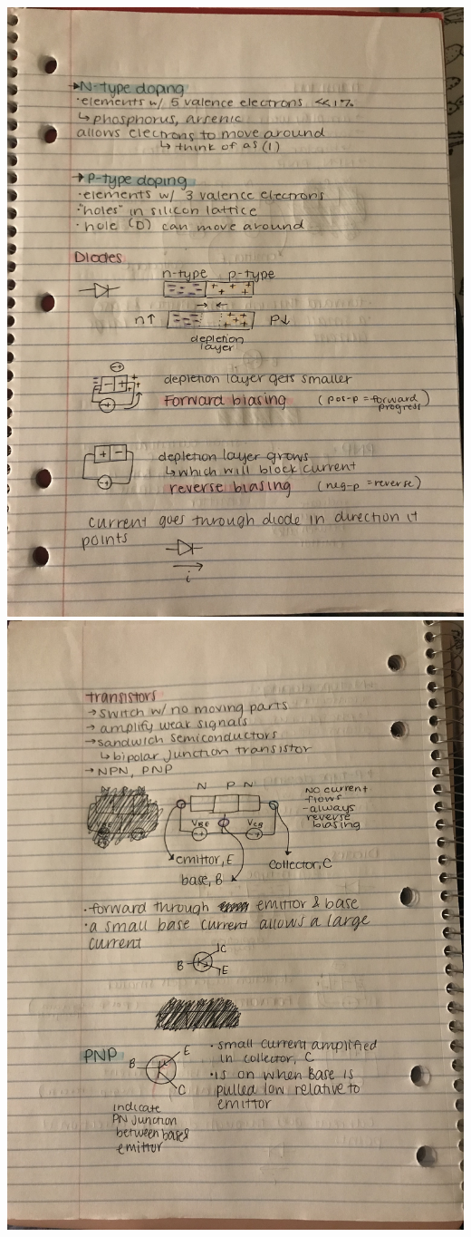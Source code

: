 \documentclass[11pt]{book}
\begin{document}
\\
\includegraphics[width=\textwidth]{figures/notes5.jpg}
\\
\includegraphics[width=\textwidth]{figures/notes6.jpg}
\end{document}
